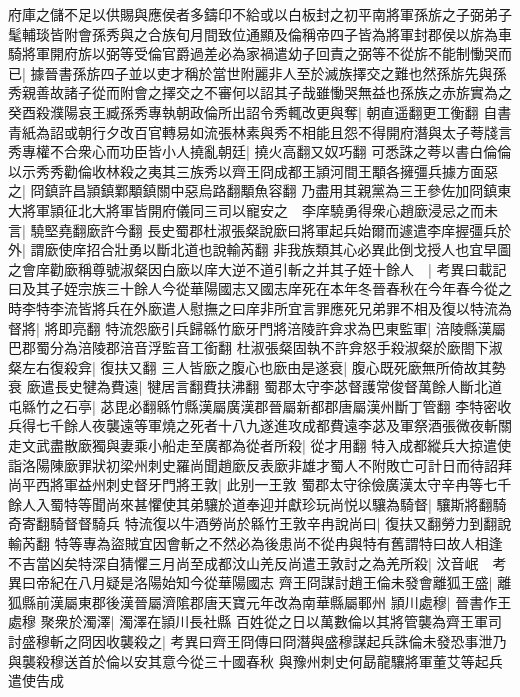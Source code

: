 府庫之儲不足以供賜與應侯者多鑄印不給或以白板封之初平南將軍孫旂之子弼弟子髦輔琰皆附會孫秀與之合族旬月間致位通顯及倫稱帝四子皆為將軍封郡侯以旂為車騎將軍開府旂以弼等受倫官爵過差必為家禍遣幼子回責之弼等不從旂不能制慟哭而已|{
	據晉書孫旂四子並以吏才稱於當世附麗非人至於滅族擇交之難也然孫旂先與孫秀親善故諸子從而附會之擇交之不審何以詔其子哉雖慟哭無益也孫族之赤旂實為之}
癸酉殺濮陽哀王臧孫秀專執朝政倫所出詔令秀輒改更與奪|{
	朝直遥翻更工衡翻}
自書青紙為詔或朝行夕改百官轉易如流張林素與秀不相能且怨不得開府潛與太子荂牋言秀專權不合衆心而功臣皆小人撓亂朝廷|{
	撓火高翻又奴巧翻}
可悉誅之荂以書白倫倫以示秀秀勸倫收林殺之夷其三族秀以齊王冏成都王頴河間王顒各擁彊兵據方面惡之|{
	冏鎮許昌頴鎮鄴顒鎮關中惡烏路翻顒魚容翻}
乃盡用其親黨為三王參佐加冏鎮東大將軍頴征北大將軍皆開府儀同三司以寵安之　李庠驍勇得衆心趙廞浸忌之而未言|{
	驍堅堯翻廞許今翻}
長史蜀郡杜淑張粲說廞曰將軍起兵始爾而遽遣李庠握彊兵於外|{
	謂廞使庠招合壯勇以斷北道也說輸芮翻}
非我族類其心必異此倒戈授人也宜早圖之會庠勸廞稱尊號淑粲因白廞以庠大逆不道引斬之并其子姪十餘人　|{
	考異曰載記曰及其子姪宗族三十餘人今從華陽國志又國志庠死在本年冬晉春秋在今年春今從之}
時李特李流皆將兵在外廞遣人慰撫之曰庠非所宜言罪應死兄弟罪不相及復以特流為督將|{
	將即亮翻}
特流怨廞引兵歸緜竹廞牙門將涪陵許弇求為巴東監軍|{
	涪陵縣漢屬巴郡蜀分為涪陵郡涪音浮監音工銜翻}
杜淑張粲固執不許弇怒手殺淑粲於廞閤下淑粲左右復殺弇|{
	復扶又翻}
三人皆廞之腹心也廞由是遂衰|{
	腹心既死廞無所倚故其勢衰}
廞遣長史犍為費遠|{
	犍居言翻費扶沸翻}
蜀郡太守李苾督護常俊督萬餘人斷北道屯緜竹之石亭|{
	苾毘必翻緜竹縣漢屬廣漢郡晉屬新都郡唐屬漢州斷丁管翻}
李特密收兵得七千餘人夜襲遠等軍燒之死者十八九遂進攻成都費遠李苾及軍祭酒張微夜斬關走文武盡散廞獨與妻乘小船走至廣都為從者所殺|{
	從才用翻}
特入成都縱兵大掠遣使詣洛陽陳廞罪狀初梁州刺史羅尚聞趙廞反表廞非雄才蜀人不附敗亡可計日而待詔拜尚平西將軍益州刺史督牙門將王敦|{
	此别一王敦}
蜀郡太守徐儉廣漢太守辛冉等七千餘人入蜀特等聞尚來甚懼使其弟驤於道奉迎并獻珍玩尚悦以驤為騎督|{
	驤斯將翻騎奇寄翻騎督督騎兵}
特流復以牛酒勞尚於緜竹王敦辛冉說尚曰|{
	復扶又翻勞力到翻說輸芮翻}
特等專為盜賊宜因會斬之不然必為後患尚不從冉與特有舊謂特曰故人相逢不吉當凶矣特深自猜懼三月尚至成都汶山羌反尚遣王敦討之為羌所殺|{
	汶音岷　考異曰帝紀在八月疑是洛陽始知今從華陽國志}
齊王冏謀討趙王倫未發會離狐王盛|{
	離狐縣前漢屬東郡後漢晉屬濟隂郡唐天寶元年改為南華縣屬鄆州}
頴川處穆|{
	晉書作王處穆}
聚衆於濁澤|{
	濁澤在頴川長社縣}
百姓從之日以萬數倫以其將管襲為齊王軍司討盛穆斬之冏因收襲殺之|{
	考異曰齊王冏傳曰冏潛與盛穆謀起兵誅倫未發恐事泄乃與襲殺穆送首於倫以安其意今從三十國春秋}
與豫州刺史何勗龍驤將軍董艾等起兵遣使告成

